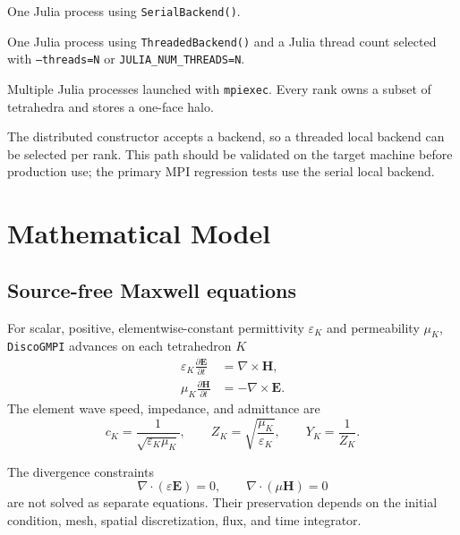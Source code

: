 \documentclass[11pt,oneside]{book}
\newcommand{\pkg}{\texttt{DiscoGMPI}}
\newcommand{\code}[1]{\texttt{#1}}
\newcommand{\vect}[1]{\boldsymbol{#1}}
\begin{document}
\begin{description}[style=nextline]
  \item[Serial]
  One Julia process using \code{SerialBackend()}.

  \item[Threaded]
  One Julia process using \code{ThreadedBackend()} and a Julia thread count
  selected with \code{--threads=N} or \code{JULIA\_NUM\_THREADS=N}.

  \item[Distributed memory]
  Multiple Julia processes launched with \code{mpiexec}. Every rank owns a
  subset of tetrahedra and stores a one-face halo.

  \item[Hybrid MPI plus threads]
  The distributed constructor accepts a backend, so a threaded local backend
  can be selected per rank. This path should be validated on the target
  machine before production use; the primary MPI regression tests use the
  serial local backend.
\end{description}

\chapter{Mathematical Model}

\section{Source-free Maxwell equations}

For scalar, positive, elementwise-constant permittivity $\varepsilon_K$ and
permeability $\mu_K$, \pkg{} advances on each tetrahedron $K$
\begin{align}
  \varepsilon_K \frac{\partial \vect E}{\partial t}
    &= \nabla \times \vect H, \label{eq:maxwell-e}\\
  \mu_K \frac{\partial \vect H}{\partial t}
    &= -\nabla \times \vect E. \label{eq:maxwell-h}
\end{align}
The element wave speed, impedance, and admittance are
\begin{equation}
  c_K = \frac{1}{\sqrt{\varepsilon_K\mu_K}},
  \qquad
  Z_K = \sqrt{\frac{\mu_K}{\varepsilon_K}},
  \qquad
  Y_K = \frac{1}{Z_K}.
\end{equation}

The divergence constraints
\begin{equation}
  \nabla\cdot(\varepsilon\vect E)=0,
  \qquad
  \nabla\cdot(\mu\vect H)=0
\end{equation}
are not solved as separate equations. Their preservation depends on the
initial condition, mesh, spatial discretization, flux, and time integrator.
\end{document}
